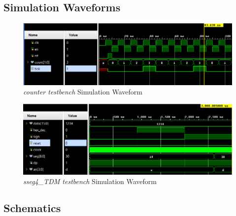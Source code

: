 \documentclass[11pt]{article}
\begin{document}
\clearpage
 
\subsection*{Simulation Waveforms}
\begin{figure}[ht]\centering
	\includegraphics[width=1.1\textwidth]{counter_test}
	\caption{\textit{counter testbench} Simulation Waveform}
	\label{fig:sim_with_table}
\end{figure}

\begin{figure}[ht]\centering
	\includegraphics[width=1.1\textwidth]{sseg4_test}
	\caption{\textit{sseg4\_TDM testbench} Simulation Waveform}
	\label{fig:sim_with_table}
\end{figure}

\clearpage

\subsection*{Schematics}
\end{document}
